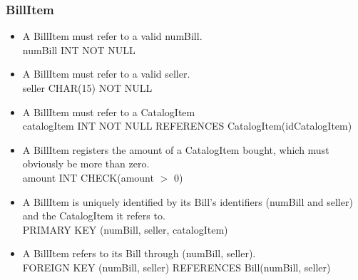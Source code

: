 \documentclass{report}[a4paper]
\theoremstyle{remark}
\begin{document}
\subsubsection{BillItem}
\begin{itemize}
    \item A BillItem must refer to a valid numBill. \\ numBill INT NOT NULL
    \item A BillItem must refer to a valid seller. \\ seller CHAR(15) NOT NULL
    \item A BillItem must refer to a CatalogItem \\ catalogItem INT NOT NULL REFERENCES CatalogItem(idCatalogItem)
    \item A BillItem registers the amount of a CatalogItem bought, which must obviously be more than zero. \\ amount INT CHECK(amount $>$ 0)
    \item A BillItem is uniquely identified by its Bill's identifiers (numBill and seller) and the CatalogItem it refers to. \\ PRIMARY KEY (numBill, seller, catalogItem)
    \item A BillItem refers to its Bill through (numBill, seller). \\ FOREIGN KEY (numBill, seller)   REFERENCES Bill(numBill, seller)
\end{itemize}
\end{document}
